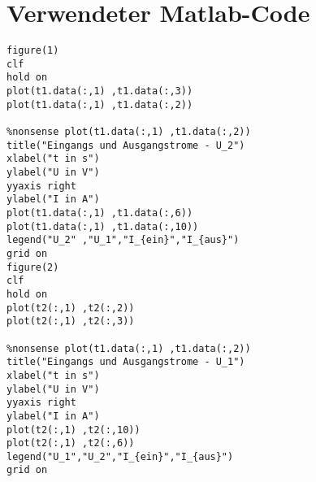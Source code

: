 %
\section{Verwendeter Matlab-Code}
\label{app:Matlab}
%
\begin{verbatim}
figure(1)
clf
hold on
plot(t1.data(:,1) ,t1.data(:,3))
plot(t1.data(:,1) ,t1.data(:,2))

%nonsense plot(t1.data(:,1) ,t1.data(:,2))
title("Eingangs und Ausgangstrome - U_2")
xlabel("t in s")
ylabel("U in V")
yyaxis right
ylabel("I in A")
plot(t1.data(:,1) ,t1.data(:,6))
plot(t1.data(:,1) ,t1.data(:,10))
legend("U_2" ,"U_1","I_{ein}","I_{aus}")
grid on
figure(2)
clf
hold on
plot(t2(:,1) ,t2(:,2))
plot(t2(:,1) ,t2(:,3))

%nonsense plot(t1.data(:,1) ,t1.data(:,2))
title("Eingangs und Ausgangstrome - U_1")
xlabel("t in s")
ylabel("U in V")
yyaxis right
ylabel("I in A")
plot(t2(:,1) ,t2(:,10))
plot(t2(:,1) ,t2(:,6))
legend("U_1","U_2","I_{ein}","I_{aus}")
grid on
\end{verbatim}

%
%
%
%
\begin{flushright}
  \textit{\autorA}
\end{flushright}
%
%
%
%
%
%
%
%
%
%
%